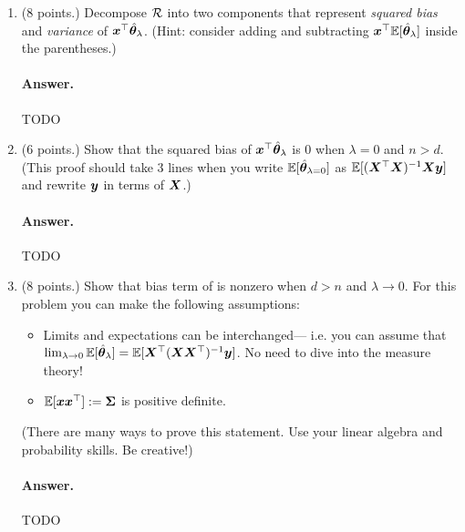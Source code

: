 \documentclass[11pt,letterpaper]{article}
\newenvironment{answer}{%
    \vspace{1em}
    \color{black}
    \paragraph{Answer.}
  }{%
    \vspace{1em}
  }
\begin{document}
\begin{enumerate}
  \item (8 points.) Decompose $\mathcal{R}$ into two components that represent \emph{squared bias} and \emph{variance} of ${\bm{x}}^\top \hat{{\bm{\theta}}}_\lambda$.
    (Hint: consider adding and subtracting ${\bm{x}}^\top \mathbb{E}[\hat{{\bm{\theta}}}_\lambda]$ inside the parentheses.)

\begin{answer}
  TODO
\end{answer}

  \item (6 points.) Show that the squared bias of ${\bm{x}}^\top \hat{{\bm{\theta}}}_\lambda$ is 0 when $\lambda = 0$ and $n > d$.
    (This proof should take 3 lines when you write $\mathbb{E}[\hat{{\bm{\theta}}}_{\lambda=0}]$ as $\mathbb{E}[({\bm{X}}^\top{\bm{X}})^{-1}{\bm{X}}{\bm{y}}]$ and rewrite ${\bm{y}}$ in terms of ${\bm{X}}$.)

\begin{answer}
  TODO
\end{answer}

  \item (8 points.) Show that bias term of is nonzero when $d > n$ and $\lambda \to 0$.
    For this problem you can make the following assumptions:
    \begin{itemize}
      \item Limits and expectations can be interchanged---
        i.e. you can assume that $\lim_{\lambda \to 0} \mathbb{E}[\hat{{\bm{\theta}}}_\lambda] = \mathbb{E}[ {\bm{X}}^\top ({\bm{X}} {\bm{X}}^\top)^{-1} {\bm{y}}]$.
        No need to dive into the measure theory!
      \item $\mathbb{E}[{\bm{x}} {\bm{x}}^\top] := {\bm{\Sigma}}$ is positive definite.
    \end{itemize}

    (There are many ways to prove this statement. Use your linear algebra and probability skills. Be creative!)


\begin{answer}
  TODO
\end{answer}

\end{enumerate}
\end{document}
